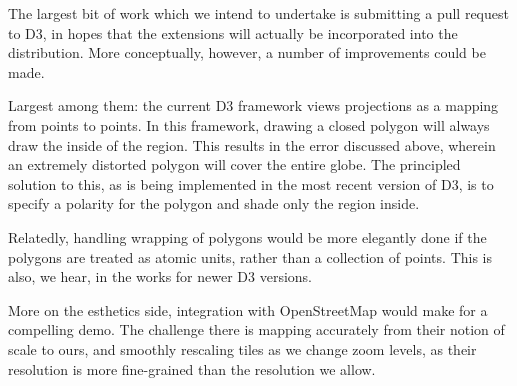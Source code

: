 The largest bit of work which we intend to undertake is submitting a pull
  request to D3, in hopes that the extensions will actually be incorporated into
  the distribution.
More conceptually, however, a number of improvements could be made.

Largest among them: the current D3 framework views projections as a mapping
  from points to points.
In this framework, drawing a closed polygon will always draw the inside of the
  region.
This results in the error discussed above, wherein an extremely distorted
  polygon will cover the entire globe.
The principled solution to this, as is being implemented in the most recent
  version of D3, is to specify a polarity for the polygon and shade only the
  region inside.

Relatedly, handling wrapping of polygons would be more elegantly done if the
  polygons are treated as atomic units, rather than a collection of points.
This is also, we hear, in the works for newer D3 versions.

More on the esthetics side, integration with OpenStreetMap would make for a
  compelling demo.
The challenge there is mapping accurately from their notion of scale to ours,
  and smoothly rescaling tiles as we change zoom levels, as their resolution
   is more fine-grained than the resolution we allow.
